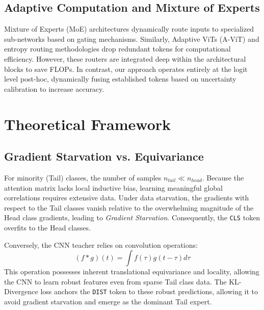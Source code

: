 \documentclass[10pt,twocolumn,letterpaper]{article}
\begin{document}
\subsection{Adaptive Computation and Mixture of Experts}
Mixture of Experts (MoE) architectures \cite{shazeer2017outrageously, fedus2022switch} dynamically route inputs to specialized sub-networks based on gating mechanisms. Similarly, Adaptive ViTs (A-ViT) \cite{yin2022vit} and entropy routing methodologies drop redundant tokens for computational efficiency. However, these routers are integrated deep within the architectural blocks to save FLOPs. In contrast, our approach operates entirely at the logit level post-hoc, dynamically fusing established tokens based on uncertainty calibration \cite{guo2017calibration} to increase accuracy.

\section{Theoretical Framework}

\subsection{Gradient Starvation vs. Equivariance}
For minority (Tail) classes, the number of samples $n_{tail} \ll n_{head}$. Because the attention matrix lacks local inductive bias, learning meaningful global correlations requires extensive data. Under data starvation, the gradients with respect to the Tail classes vanish relative to the overwhelming magnitude of the Head class gradients, leading to \textit{Gradient Starvation}. Consequently, the \texttt{CLS} token overfits to the Head classes.

Conversely, the CNN teacher relies on convolution operations:
\begin{equation}
    (f * g)(t) = \int f(\tau)g(t-\tau)d\tau
\end{equation}
This operation possesses inherent translational equivariance and locality, allowing the CNN to learn robust features even from sparse Tail class data. The KL-Divergence loss anchors the \texttt{DIST} token to these robust predictions, allowing it to avoid gradient starvation and emerge as the dominant Tail expert.
\end{document}
